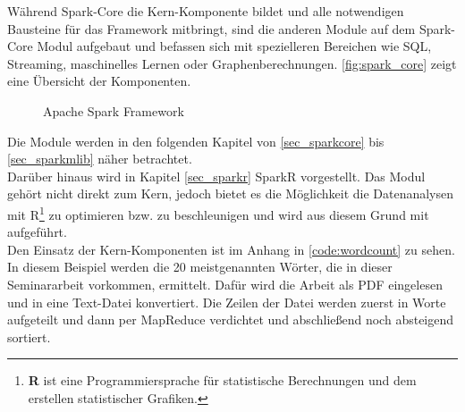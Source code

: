 \noindent
Während Spark-Core die Kern-Komponente bildet und alle notwendigen Bausteine für das Framework mitbringt, sind die anderen Module auf dem Spark-Core Modul aufgebaut und befassen sich mit spezielleren Bereichen wie SQL, Streaming, maschinelles Lernen oder Graphenberechnungen. \autoref{fig:spark_core} zeigt eine Übersicht der Komponenten. \\

\begin{figure}[h]
  \centering
  \caption{Apache Spark Framework \cite{DATABRICK_SPARK_KEY_TERMS}}\label{fig:spark_core}
\end{figure}


\noindent
Die Module werden in den folgenden Kapitel von \ref{sec_sparkcore} bis \ref{sec_sparkmlib} näher betrachtet. \\

\noindent
Darüber hinaus wird in Kapitel \ref{sec_sparkr} SparkR vorgestellt. Das Modul gehört nicht direkt zum Kern, jedoch bietet es die Möglichkeit die Datenanalysen mit R\footnote{\textbf{R} ist eine Programmiersprache für statistische Berechnungen und dem erstellen statistischer Grafiken. } zu optimieren bzw. zu beschleunigen und wird aus diesem Grund mit aufgeführt. \\

\noindent
Den Einsatz der Kern-Komponenten ist im Anhang in \autoref{code:wordcount} zu sehen. In diesem Beispiel werden die 20 meistgenannten Wörter, die in dieser Seminararbeit vorkommen, ermittelt. Dafür wird die Arbeit als PDF eingelesen und in eine Text-Datei konvertiert. Die Zeilen der Datei werden zuerst in Worte aufgeteilt und dann per MapReduce verdichtet und abschließend noch absteigend sortiert.




